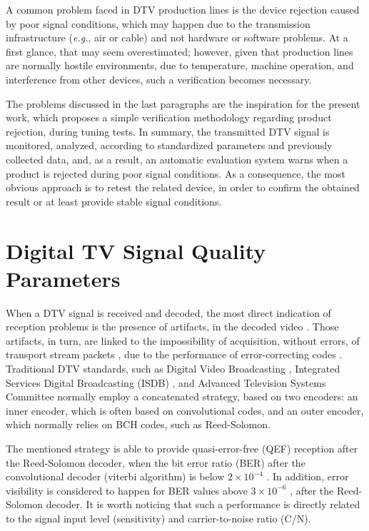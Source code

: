 \documentclass[conference]{IEEEtran}
\begin{document}
A common problem faced in DTV production lines is the device rejection caused by poor signal conditions, which may happen due to the transmission infrastructure ({\it e.g.}, air or cable) and not hardware or software problems. At a first glance, that may seem overestimated; however, given that production lines are normally hostile environments, due to temperature, machine operation, and interference from other devices, such a verification becomes necessary.

The problems discussed in the last paragraphs are the inspiration for the present work, which proposes a simple verification methodology regarding product rejection, during tuning tests. In summary, the transmitted DTV signal is monitored, analyzed, according to standardized parameters and previously collected data, and, as a result, an automatic evaluation system warns when a product is rejected during poor signal conditions. As a consequence, the most obvious approach is to retest the related device, in order to confirm the obtained result or at least provide stable signal conditions. %

\section{Digital TV Signal Quality Parameters}\label{measure}
When a DTV signal is received and decoded, the most direct indication of reception problems is the presence of artifacts, in the decoded video \cite{keith}. Those artifacts, in turn, are linked to the impossibility of acquisition, without errors, of transport stream packets \cite{reimers,iso13818_1}, due to the performance of error-correcting codes \cite{keith,reimers}. Traditional DTV standards, such as Digital Video Broadcasting \cite{dvb}, Integrated Services Digital Broadcasting (ISDB) \cite{isdb}, and Advanced Television Systems Committee \cite{atsc} normally employ a concatenated strategy, based on two encoders: an inner encoder, which is often based on convolutional codes, and an outer encoder, which normally relies on BCH codes, such as Reed-Solomon.

The mentioned strategy is able to provide quasi-error-free (QEF) reception after the Reed-Solomon decoder, when the bit error ratio (BER) after the convolutional decoder (viterbi algorithm) is below $2\times 10^{-4}$ \cite{dvb}. In addition, error visibility is considered to happen for BER values above $3\times 10^{-6}$ \cite{fcc}, after the Reed-Solomon decoder. It is worth noticing that such a performance is directly related to the signal input level (sensitivity) and carrier-to-noise ratio (C/N).
\end{document}
